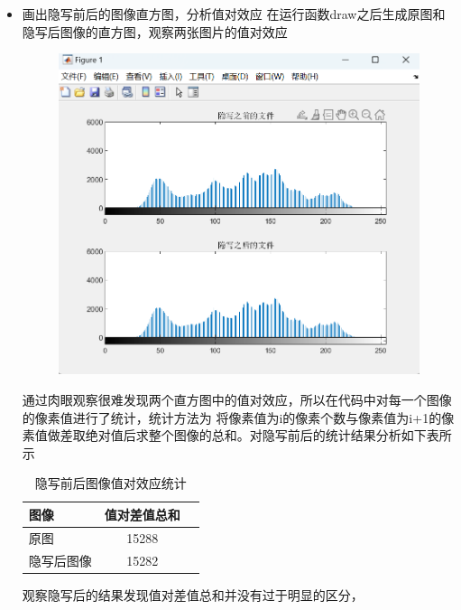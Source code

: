 \documentclass[a4paper,11pt,UTF8]{ctexart}
\newcommand{\bottomcaption}{%
\setlength{\abovecaptionskip}{6pt}%
\setlength{\belowcaptionskip}{6pt}%
\caption}
\newcommand{\xiaowuhao}{\fontsize{9pt}{\baselineskip}\selectfont}   %
\begin{document}
\begin{itemize}
\newpage
      \item 画出隐写前后的图像直方图，分析值对效应
        在运行函数draw之后生成原图和隐写后图像的直方图，观察两张图片的值对效应\par
        \begin{figure}[!htbp]
        \centering
        \includegraphics[width=\textwidth]{LSB_draw.png}
        \bottomcaption{\xiaowuhao{隐写前后图像直方图}}
        \end{figure}
        通过肉眼观察很难发现两个直方图中的值对效应，所以在代码中对每一个图像的像素值进行了统计，统计方法为
        将像素值为i的像素个数与像素值为i+1的像素值做差取绝对值后求整个图像的总和。对隐写前后的统计结果分析如下表所示\par
        \begin{table}[!h!tbp]
          \caption{隐写前后图像值对效应统计}\label{tab1}
            \centering
          \begin{tabular*}{0.75\textwidth}{@{\extracolsep{\fill}}lcc}
              \toprule
              图像          &值对差值总和                \\
              \midrule
              原图              &15288         \\
              隐写后图像        &15282        \\
              \bottomrule
          \end{tabular*}
        \end{table}
        观察隐写后的结果发现值对差值总和并没有过于明显的区分，

\end{itemize}
\end{document}
